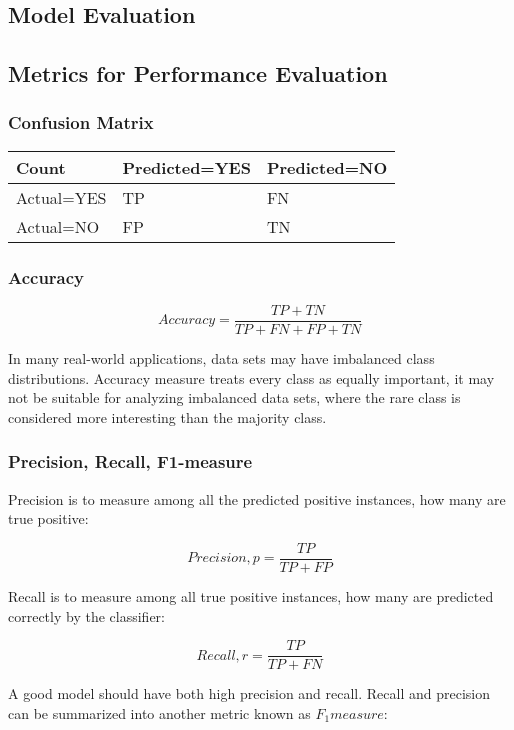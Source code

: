\begin{multicols}{2}
\section{Model Evaluation}

\subsection{Metrics for Performance Evaluation}

\subsubsection{Confusion Matrix}
\begin{center}
\begin{tabular}{ | l | l | l | } 
    \hline
    Count & Predicted=YES & Predicted=NO \\
    \hline
    Actual=YES & TP & FN \\
    \hline
    Actual=NO & FP & TN \\
    \hline
\end{tabular}
\end{center}

\subsubsection{Accuracy}

$$Accuracy=\frac{TP + TN}{TP + FN + FP + TN}$$

\noindent In many real-world applications, data sets may have imbalanced class distributions. Accuracy measure treats every class as equally important, it may not be suitable for analyzing imbalanced data sets, where the rare class is considered more interesting than the majority class. \\

\subsubsection{Precision, Recall, F1-measure}

\noindent Precision is to measure among all the predicted positive instances, how many are true positive:

$$Precision,p=\frac{TP}{TP + FP}$$

\noindent Recall is to measure among all true positive instances, how many are predicted correctly by the classifier:

$$Recall,r=\frac{TP}{TP+FN}$$

\noindent A good model should have both high precision and recall. Recall and precision can be summarized into another metric known as $F_1measure$:


\end{multicols}
